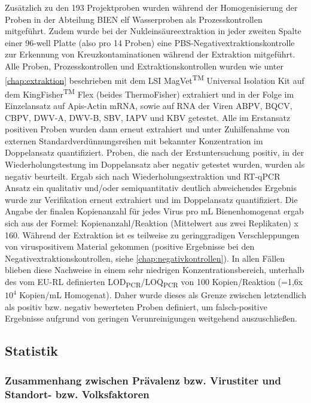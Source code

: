 Zusätzlich zu den 193 Projektproben wurden während der Homogenisierung der Proben in der Abteilung BIEN elf Wasserproben als Prozesskontrollen mitgeführt. Zudem wurde bei der Nukleinsäureextraktion in jeder zweiten Spalte einer 96-well Platte (also pro 14 Proben) eine PBS-Negativextraktionskontrolle zur Erkennung von Kreuzkontaminationen während der Extraktion mitgeführt. Alle Proben, Prozesskontrollen und Extraktionskontrollen wurden wie unter \cref{chap:extraktion} beschrieben mit dem LSI MagVet\textsuperscript{TM} Universal Isolation Kit auf dem KingFisher\textsuperscript{TM} Flex (beides ThermoFisher) extrahiert und in der Folge im Einzelansatz auf Apis-Actin mRNA, sowie auf RNA der Viren ABPV, BQCV, CBPV, DWV-A, DWV-B, SBV, IAPV und KBV getestet. Alle im Erstansatz positiven Proben wurden dann erneut extrahiert und unter Zuhilfenahme von externen Standardverdünnungsreihen mit bekannter Konzentration im Doppelansatz quantifiziert. Proben, die nach der Erstuntersuchung positiv, in der Wiederholungstestung im Doppelansatz aber negativ getestet wurden, wurden als negativ beurteilt. Ergab sich nach Wiederholungsextraktion und RT-qPCR Ansatz ein qualitativ und/oder semiquantitativ deutlich abweichendes Ergebnis wurde zur Verifikation erneut extrahiert und im Doppelansatz quantifiziert. Die Angabe der finalen Kopienanzahl für jedes Virus pro \si{\milli\liter} Bienenhomogenat ergab sich aus der Formel: Kopienanzahl/Reaktion (Mittelwert aus zwei Replikaten) x 160. Während der Extraktion ist es teilweise zu geringgradigen Verschleppungen von viruspositivem Material gekommen (positive Ergebnisse bei den Negativextraktionskontrollen, siehe \cref{chap:negativkontrollen}). In allen Fällen blieben diese Nachweise in einem sehr niedrigen Konzentrationsbereich, unterhalb des vom EU-RL definierten LOD\textsubscript{PCR}/LOQ\textsubscript{PCR} von 100 Kopien/Reaktion (=1,6x$10^4$ Kopien/\si{\milli\liter} Homogenat). Daher wurde dieses als Grenze zwischen letztendlich als positiv bzw. negativ bewerteten Proben definiert, um falsch-positive Ergebnisse aufgrund von geringen Verunreinigungen weitgehend auszuschließen.

\subsection{Statistik}

\subsubsection{Zusammenhang zwischen Prävalenz bzw. Virustiter und Standort- bzw.
Volksfaktoren}

